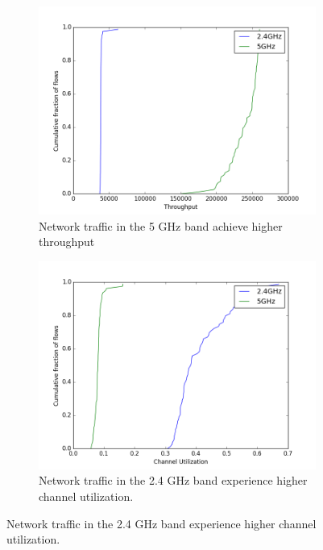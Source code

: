 \begin{figure}
\begin{subfigure}{0.5\textwidth}
\includegraphics[width=\linewidth]{figure/throughput(5g_vs_2g).png}
\caption{Network traffic in the 5 GHz band achieve higher throughput} 
\label{fig:throughput}
\end{subfigure}
\hspace*{\fill} %
\begin{subfigure}{0.5\textwidth}
\includegraphics[width=\linewidth]{figure/channel_utilization(2g_vs_5g).png}
\caption{Network traffic in the 2.4 GHz band experience higher channel utilization.} 
\label{fig:utilization}
\end{subfigure}

\end{figure}
